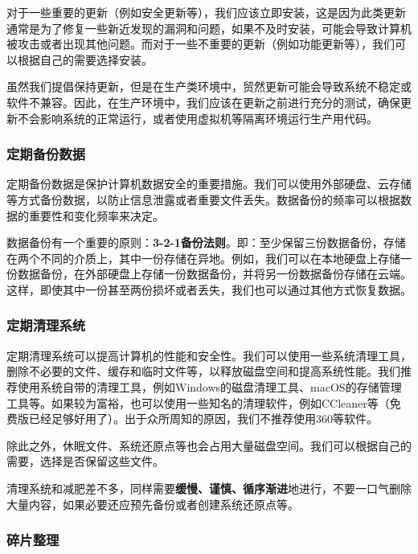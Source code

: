对于一些重要的更新（例如安全更新等），我们应该立即安装，这是因为此类更新通常是为了修复一些新近发现的漏洞和问题，如果不及时安装，可能会导致计算机被攻击或者出现其他问题。而对于一些不重要的更新（例如功能更新等），我们可以根据自己的需要选择安装。

\begin{caution}
  虽然我们提倡保持更新，但是在生产类环境中，贸然更新可能会导致系统不稳定或软件不兼容。因此，在生产环境中，我们应该在更新之前进行充分的测试，确保更新不会影响系统的正常运行，或者使用虚拟机等隔离环境运行生产用代码。
\end{caution}

\subsubsection{定期备份数据}

定期备份数据是保护计算机数据安全的重要措施。我们可以使用外部硬盘、云存储等方式备份数据，以防止信息泄露或者重要文件丢失。数据备份的频率可以根据数据的重要性和变化频率来决定。

数据备份有一个重要的原则：\textbf{3-2-1备份法则}。即：至少保留三份数据备份，存储在两个不同的介质上，其中一份存储在异地。例如，我们可以在本地硬盘上存储一份数据备份，在外部硬盘上存储一份数据备份，并将另一份数据备份存储在云端。这样，即使其中一份甚至两份损坏或者丢失，我们也可以通过其他方式恢复数据。

\subsubsection{定期清理系统}

定期清理系统可以提高计算机的性能和安全性。我们可以使用一些系统清理工具，删除不必要的文件、缓存和临时文件等，以释放磁盘空间和提高系统性能。我们推荐使用系统自带的清理工具，例如Windows的磁盘清理工具、macOS的存储管理工具等。如果较为富裕，也可以使用一些知名的清理软件，例如CCleaner等（免费版已经足够好用了）。出于众所周知的原因，我们不推荐使用360等软件。

除此之外，休眠文件、系统还原点等也会占用大量磁盘空间。我们可以根据自己的需要，选择是否保留这些文件。

\begin{caution}
  清理系统和减肥差不多，同样需要\textbf{缓慢、谨慎、循序渐进}地进行，不要一口气删除大量内容，如果必要还应预先备份或者创建系统还原点等。
\end{caution}

\subsubsection{碎片整理}

